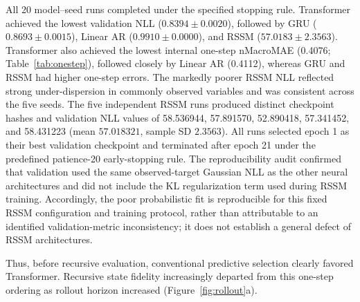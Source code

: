 \documentclass[preprint,12pt]{elsarticle}
\begin{document}
All 20 model--seed runs completed under the specified stopping rule.
Transformer achieved the lowest validation NLL
($0.8394\pm0.0020$), followed by GRU
($0.8693\pm0.0015$), Linear AR ($0.9910\pm0.0000$), and RSSM
($57.0183\pm2.3563$). Transformer also achieved the lowest internal
one-step nMacroMAE (0.4076; Table~\ref{tab:onestep}), followed closely
by Linear AR (0.4112), whereas GRU and RSSM had higher one-step errors.
The markedly poorer RSSM NLL reflected strong under-dispersion in
commonly observed variables and was consistent across the five seeds.
The five independent RSSM runs produced distinct checkpoint hashes and
validation NLL values of 58.536944, 57.891570, 52.890418, 57.341452,
and 58.431223 (mean $57.018321$, sample SD $2.3563$). All runs selected
epoch 1 as their best validation checkpoint and terminated after epoch
21 under the predefined patience-20 early-stopping rule. The
reproducibility audit confirmed that validation used the same
observed-target Gaussian NLL as the other neural architectures and did
not include the KL regularization term used during RSSM training.
Accordingly, the poor probabilistic fit is reproducible for this fixed
RSSM configuration and training protocol, rather than attributable to
an identified validation-metric inconsistency; it does not establish a
general defect of RSSM architectures.

\begin{table}[ht]
\centering
\caption{One-step predictive performance. Validation NLL defines the
conventional model-selection criterion. Set B values are interpreted
in Section~\ref{sec:setb_results}.}
\label{tab:onestep}
\small
{}
\end{table}

Thus, before recursive evaluation, conventional predictive selection
clearly favored Transformer. Recursive state fidelity increasingly
departed from this one-step ordering as rollout horizon increased
(Figure~\ref{fig:rollout}a).
\end{document}
